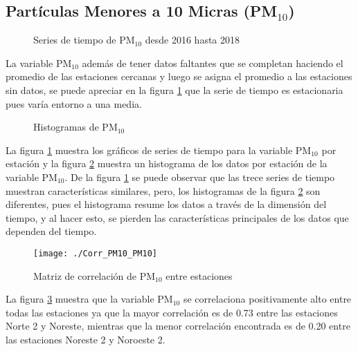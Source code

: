 \subsection{Partículas Menores a 10 Micras (PM$_{10}$)}
\begin{figure}[H]
\centering
{}
\caption{Series de tiempo de PM$_{10}$ desde 2016 hasta 2018}
\label{seriePM10}
\end{figure}

La variable PM$_{10}$ además de tener datos faltantes que se completan haciendo el promedio de las estaciones cercanas y luego se asigna el promedio a las estaciones sin datos, se puede apreciar en la figura \ref{seriePM10} que la serie de tiempo es estacionaria pues varía entorno a una media.

\begin{figure}[H]
\centering
{}
\caption{Histogramas de PM$_{10}$}
\label{histPM10}
\end{figure}

La figura \ref{seriePM10} muestra los gráficos de series de tiempo para la variable PM$_{10}$ por estación y la figura \ref{histPM10} muestra un histograma de los datos por estación de la variable PM$_{10}$. De la figura \ref{seriePM10} se puede observar que las trece series de tiempo muestran características similares, pero, los histogramas de la figura \ref{histPM10} son diferentes, pues el histograma resume los datos a través de la dimensión del tiempo, y al hacer esto, se pierden las características principales de los datos que dependen del tiempo.

\begin{figure}[H]
\centering
\texttt{[image: ./Corr\_PM10\_PM10]}
\caption{Matriz de correlación de PM$_{10}$ entre estaciones }
\label{corrPM10_2}
\end{figure}

La figura \ref{corrPM10_2} muestra que la variable PM$_{10}$ se correlaciona positivamente alto entre todas las estaciones ya que la mayor correlación es de 0.73 entre las estaciones Norte 2 y Noreste, mientras que la menor correlación encontrada es de 0.20 entre las estaciones Noreste 2 y Noroeste 2.

